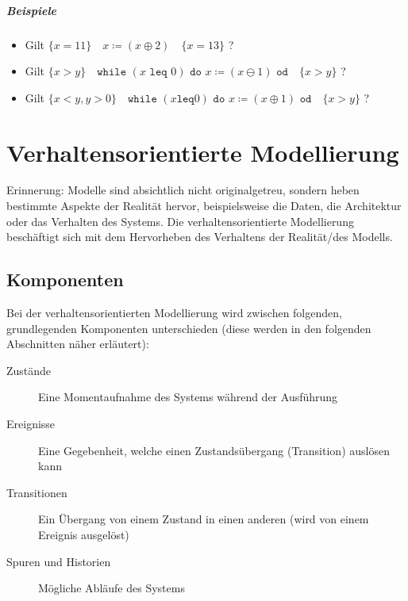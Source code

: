 															\paragraph{Beispiele}
																\begin{itemize}
																	\item Gilt $ \{ x = 11 \} \quad x \coloneqq (x \oplus 2) \quad \{ x = 13 \} $ ?
																	\item Gilt $ \{ x > y \} \quad \texttt{while } (x \texttt{ leq } 0) \texttt{ do } x \coloneqq (x \ominus 1) \texttt{ od} \quad \{ x > y \} $ ?
																	\item Gilt $ \{ x < y, y > 0 \} \quad \texttt{while } (x \texttt{leq} 0) \texttt{ do } x \coloneqq (x \oplus 1) \texttt{ od} \quad \{ x > y \} $ ?
																\end{itemize}

												\chapter{Verhaltensorientierte Modellierung}
													Erinnerung: Modelle sind absichtlich nicht originalgetreu, sondern heben bestimmte Aspekte der Realität hervor, beispielsweise die Daten, die Architektur oder das Verhalten des Systems. Die verhaltensorientierte Modellierung beschäftigt sich mit dem Hervorheben des Verhaltens der Realität/des Modells.

													\section{Komponenten}
														Bei der verhaltensorientierten Modellierung wird zwischen folgenden, grundlegenden Komponenten unterschieden (diese werden in den folgenden Abschnitten näher erläutert):
														\begin{description}
															\item[Zustände] Eine Momentaufnahme des Systems während der Ausführung
															\item[Ereignisse] Eine Gegebenheit, welche einen Zustandsübergang (Transition) auslösen kann
															\item[Transitionen] Ein Übergang von einem Zustand in einen anderen (wird von einem Ereignis ausgelöst)
															\item[Spuren und Historien] Mögliche Abläufe des Systems
														\end{description}

